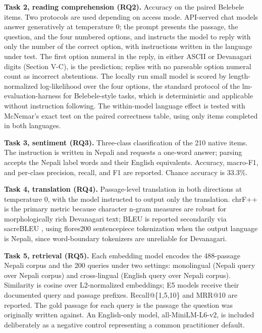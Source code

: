 \documentclass[conference]{IEEEtran}
\begin{document}
\textbf{Task 2, reading comprehension (RQ2).} Accuracy on the paired Belebele items. Two protocols are used depending on access mode. API-served chat models answer generatively at temperature 0; the prompt presents the passage, the question, and the four numbered options, and instructs the model to reply with only the number of the correct option, with instructions written in the language under test. The first option numeral in the reply, in either ASCII or Devanagari digits (Section V-C), is the prediction; replies with no parseable option numeral count as incorrect abstentions. The locally run small model is scored by length-normalized log-likelihood over the four options, the standard protocol of the lm-evaluation-harness for Belebele-style tasks, which is deterministic and applicable without instruction following. The within-model language effect is tested with McNemar's exact test on the paired correctness table, using only items completed in both languages.

\textbf{Task 3, sentiment (RQ3).} Three-class classification of the 210 native items. The instruction is written in Nepali and requests a one-word answer; parsing accepts the Nepali label words and their English equivalents. Accuracy, macro-F1, and per-class precision, recall, and F1 are reported. Chance accuracy is 33.3\%.

\textbf{Task 4, translation (RQ4).} Passage-level translation in both directions at temperature 0, with the model instructed to output only the translation. chrF++ \cite{popovic2017chrf} is the primary metric because character n-gram measures are robust for morphologically rich Devanagari text; BLEU \cite{papineni2002bleu} is reported secondarily via sacreBLEU \cite{post2018sacrebleu}, using flores200 sentencepiece tokenization when the output language is Nepali, since word-boundary tokenizers are unreliable for Devanagari.

\textbf{Task 5, retrieval (RQ5).} Each embedding model encodes the 488-passage Nepali corpus and the 200 queries under two settings: monolingual (Nepali query over Nepali corpus) and cross-lingual (English query over Nepali corpus). Similarity is cosine over L2-normalized embeddings; E5 models receive their documented query and passage prefixes. Recall@\{1,5,10\} and MRR@10 are reported. The gold passage for each query is the passage the question was originally written against. An English-only model, all-MiniLM-L6-v2, is included deliberately as a negative control representing a common practitioner default.
\end{document}
